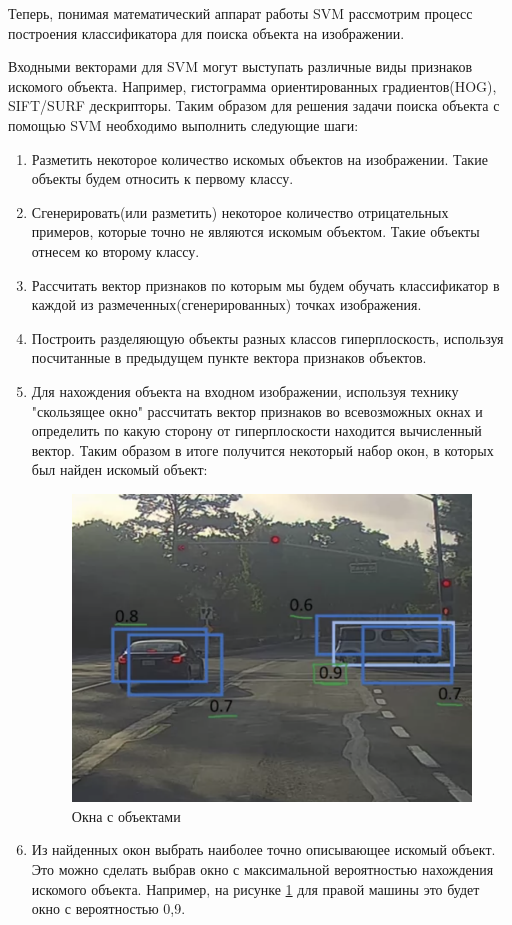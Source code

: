 Теперь, понимая математический аппарат работы SVM рассмотрим процесс построения классификатора для поиска объекта на изображении.

Входными векторами для SVM могут выступать различные виды признаков искомого объекта. Например, гистограмма ориентированных градиентов(HOG)\cite{b:HOG}, SIFT\cite{b:SIFT}/SURF\cite{b:SURF} дескрипторы.
Таким образом для решения задачи поиска объекта с помощью SVM необходимо выполнить следующие шаги:
\begin{enumerate}
	\item Разметить некоторое количество искомых объектов на изображении. Такие объекты будем относить к первому классу.
	\item Сгенерировать(или разметить) некоторое количество отрицательных примеров, которые точно не являются искомым объектом. Такие объекты отнесем ко второму классу.
	\item Рассчитать вектор признаков по которым мы будем обучать классификатор в каждой из размеченных(сгенерированных) точках изображения.
	\item Построить разделяющую объекты разных классов гиперплоскость, используя посчитанные в предыдущем пункте вектора признаков объектов.
	\item Для нахождения объекта на входном изображении, используя технику "скользящее окно"\cite{b:window} рассчитать вектор признаков во всевозможных окнах и определить по какую сторону от гиперплоскости находится вычисленный вектор. 
	Таким образом в итоге получится некоторый набор окон, в которых был найден искомый объект:
	\begin{figure}[h!]
		\centering
		\includegraphics[width=0.7\linewidth]{pictures/screenshot024}
		\caption{Окна с объектами}
		\label{fig:screenshot024}
	\end{figure}
	\item Из найденных окон выбрать наиболее точно описывающее искомый объект. Это можно сделать выбрав окно с максимальной вероятностью нахождения искомого объекта. Например, на рисунке \ref{fig:screenshot024} для правой машины это будет окно с вероятностью 0,9.
\end{enumerate}

